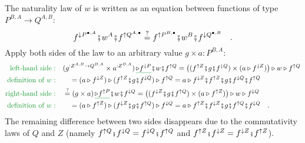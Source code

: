 The naturality law of $w$ is written as an equation between functions
of type $P^{B,A}\rightarrow Q^{A,B}$:
\[
f^{\downarrow P^{\bullet,A}}\bef w^{A}\bef f^{\uparrow Q^{A,\bullet}}\overset{?}{=}f^{\uparrow P^{B,\bullet}}\bef w^{B}\bef f^{\downarrow Q^{\bullet,B}}\quad.
\]
Apply both sides of the law to an arbitrary value $g\times a:P^{B,A}$:
\begin{align*}
{\color{greenunder}\text{left-hand side}:}\quad & (g^{:Z^{A,B}\rightarrow Q^{B,A}}\times a^{:Z^{B,A}})\,\gunderline{\triangleright f^{\downarrow P}}\bef w\bef f^{\uparrow Q}=\big((f^{\uparrow Z}\bef g\bef f^{\downarrow Q})\times(a\triangleright f^{\downarrow Z})\big)\triangleright w\triangleright f^{\uparrow Q}\\
{\color{greenunder}\text{definition of }w:}\quad & \quad=(a\triangleright f^{\downarrow Z})\triangleright(f^{\uparrow Z}\bef g\bef f^{\downarrow Q})\triangleright f^{\uparrow Q}=a\triangleright f^{\downarrow Z}\bef f^{\uparrow Z}\bef g\bef f^{\downarrow Q}\bef f^{\uparrow Q}\\
{\color{greenunder}\text{right-hand side}:}\quad & \overset{?}{=}(g\times a)\,\gunderline{\triangleright f^{\uparrow P}}\bef w\bef f^{\downarrow Q}=\big((f^{\downarrow Z}\bef g\bef f^{\uparrow Q})\times(a\triangleright f^{\uparrow Z})\big)\triangleright w\triangleright f^{\downarrow Q}\\
{\color{greenunder}\text{definition of }w:}\quad & \quad=(a\triangleright f^{\uparrow Z})\triangleright(f^{\downarrow Z}\bef g\bef f^{\uparrow Q})\triangleright f^{\downarrow Q}=a\triangleright f^{\uparrow Z}\bef f^{\downarrow Z}\bef g\bef f^{\uparrow Q}\bef f^{\downarrow Q}\quad.
\end{align*}
The remaining difference between two sides disappears due to the commutativity
laws of $Q$ and $Z$ (namely $f^{\uparrow Q}\bef f^{\downarrow Q}=f^{\downarrow Q}\bef f^{\uparrow Q}$
and $f^{\uparrow Z}\bef f^{\downarrow Z}=f^{\downarrow Z}\bef f^{\uparrow Z}$).

